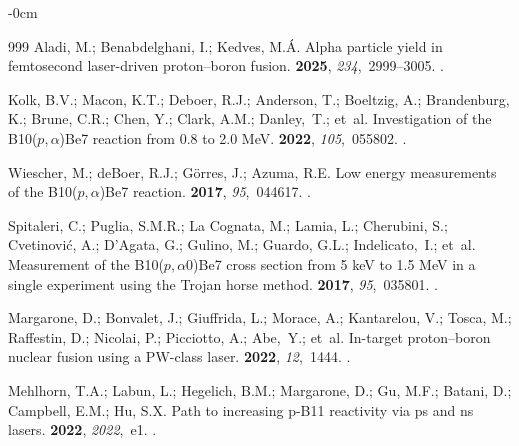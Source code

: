 \documentclass[particles,article,accept,pdftex,moreauthors]{Definitions/mdpi}
\begin{document}
\begin{adjustwidth}{-\extralength}{0cm}
\begin{thebibliography}{999}
Aladi, M.; Benabdelghani, I.;  Kedves, M.Á.
\newblock Alpha particle yield in femtosecond laser-driven proton--boron
  fusion.
 {\bf 2025}, {\em 234},~2999--3005.
.





Kolk, B.V.; Macon, K.T.;  Deboer, R.J.; Anderson, T.; Boeltzig, A.; Brandenburg, K.; Brune, C.R.; Chen, Y.; Clark, A.M.; Danley,~T.; et~al.
\newblock Investigation of the B10(\ensuremath{p,\alpha})Be7 reaction from 0.8
  to 2.0 MeV.
 {\bf 2022}, {\em 105},~055802.
.

Wiescher, M.; deBoer, R.J.; Görres, J.; Azuma, R.E.
\newblock Low energy measurements of the B10(\ensuremath{p,\alpha})Be7
  reaction.
 {\bf 2017}, {\em 95},~044617.
.

Spitaleri, C.; Puglia, S.M.R.;  La Cognata, M.; Lamia, L.; Cherubini, S.; Cvetinović, A.; D'Agata, G.; Gulino, M.; Guardo, G.L.; Indelicato,~I.; et~al.
\newblock Measurement of the B10(\ensuremath{p,\alpha}0)Be7 cross section from
  5 keV to 1.5 MeV in a single experiment using the Trojan horse method.
 {\bf 2017}, {\em 95},~035801.
.


Margarone, D.; Bonvalet, J.;  Giuffrida, L.; Morace, A.; Kantarelou, V.; Tosca, M.; Raffestin, D.; Nicolai, P.; Picciotto, A.; Abe,~Y.; et~al.
\newblock In-target proton--boron nuclear fusion using a PW-class laser.
 {\bf 2022}, {\em 12},~1444.
.






Mehlhorn, T.A.; Labun, L.;  Hegelich, B.M.; Margarone, D.; Gu, M.F.; Batani, D.; Campbell, E.M.; Hu, S.X.
\newblock Path to increasing p-B11 reactivity via ps and ns lasers.
 {\bf 2022}, {\em 2022},~e1.
.


\end{thebibliography}
\end{adjustwidth}
\end{document}
